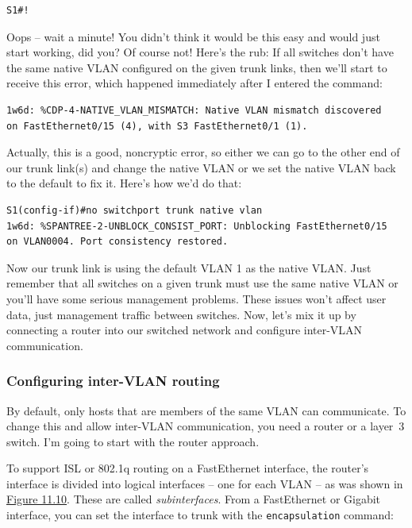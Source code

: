 \documentclass[b5paper,11pt]{memoir}
\begin{document}
\begin{verbatim}
S1#!
\end{verbatim}

Oops -- wait a minute! You didn't think it would be this easy and would
just start working, did you? Of course not! Here's the rub: If all
switches don't have the same native VLAN configured on the given trunk
links, then we'll start to receive this error, which happened
immediately after I entered the command:

\begin{verbatim}
1w6d: %CDP-4-NATIVE_VLAN_MISMATCH: Native VLAN mismatch discovered
on FastEthernet0/15 (4), with S3 FastEthernet0/1 (1).
\end{verbatim}

Actually, this is a good, noncryptic error, so either we can go to the
other end of our trunk link(s) and change the native VLAN or we set the
native VLAN back to the default to fix it. Here's how we'd do that:

\begin{verbatim}
S1(config-if)#no switchport trunk native vlan
1w6d: %SPANTREE-2-UNBLOCK_CONSIST_PORT: Unblocking FastEthernet0/15
on VLAN0004. Port consistency restored.
\end{verbatim}

Now our trunk link is
using the default VLAN 1 as the native VLAN. Just remember that all
switches on a given trunk must use the same native VLAN or you'll have
some serious management problems. These issues won't affect user data,
just management traffic between switches. Now, let's mix it up by
connecting a router into our switched network and configure inter-VLAN
communication.

\subsubsection{Configuring inter-VLAN routing}

By default, only hosts that are members of the same VLAN can
communicate. To change this and allow inter-VLAN communication, you need
a router or a layer~3 switch. I'm going to start with the router
approach.

To support ISL or 802.1q routing on a FastEthernet interface, the
router's interface is divided into logical interfaces -- one for each
VLAN -- as was shown in
\protect\hyperlink{c11.xhtmlux5cux23figure11-10}{Figure 11.10}. These
are called \emph{subinterfaces}. From a FastEthernet or Gigabit
interface, you can set the interface to trunk with the
\texttt{encapsulation} command:
\end{document}

